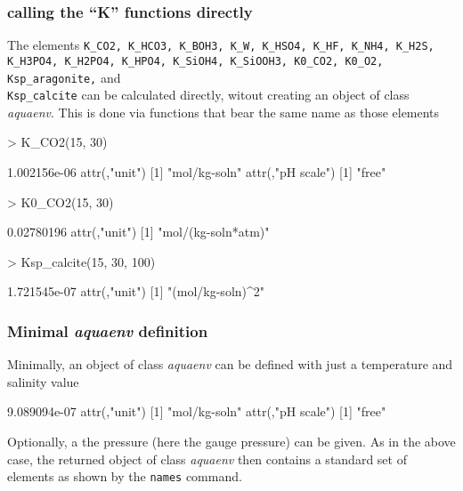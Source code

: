 \documentclass[article,nojss]{jss}
\begin{document}
\subsubsection{calling the ``K'' functions directly}
The elements \texttt{K\_CO2, K\_HCO3, K\_BOH3, K\_W, K\_HSO4, K\_HF, K\_NH4, K\_H2S, K\_H3PO4, K\_H2PO4, K\_HPO4, K\_SiOH4, K\_SiOOH3, K0\_CO2, K0\_O2, Ksp\_aragonite,} and \\
\texttt{Ksp\_calcite} can be calculated directly, witout creating an object of class \textit{aquaenv}. This is done via functions that bear the same name as those elements

\begin{Schunk}
\begin{Sinput}
> K_CO2(15, 30)
\end{Sinput}
\begin{Soutput}
[1] 1.002156e-06
attr(,"unit")
[1] "mol/kg-soln"
attr(,"pH scale")
[1] "free"
\end{Soutput}
\begin{Sinput}
> K0_CO2(15, 30)
\end{Sinput}
\begin{Soutput}
[1] 0.02780196
attr(,"unit")
[1] "mol/(kg-soln*atm)"
\end{Soutput}
\begin{Sinput}
> Ksp_calcite(15, 30, 100)
\end{Sinput}
\begin{Soutput}
[1] 1.721545e-07
attr(,"unit")
[1] "(mol/kg-soln)^2"
\end{Soutput}
\end{Schunk}


\subsubsection{Minimal \textit{aquaenv} definition}
Minimally, an object of class \textit{aquaenv} can be defined with just a temperature and salinity value

\begin{Schunk}
\begin{Soutput}
[1] 9.089094e-07
attr(,"unit")
[1] "mol/kg-soln"
attr(,"pH scale")
[1] "free"
\end{Soutput}
\end{Schunk}

Optionally, a the pressure (here the gauge pressure) can be given. As in the above case, the returned object of class \textit{aquaenv} then contains
a standard set of elements as shown by the \texttt{names} command.
\end{document}
